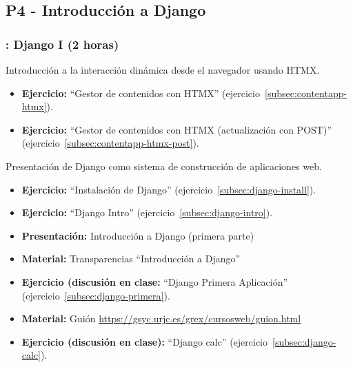 \documentclass[a4paper,12pt]{article}
\begin{document}



\subsection{P4 - Introducción a Django}

\subsubsection{\juevesG: Django I (2 horas)}
\label{cal:juevesG}

Introducción a la interacción dinámica desde el navegador usando HTMX.

\begin{itemize}
\item \textbf{Ejercicio:} ``Gestor de contenidos con HTMX'' (ejercicio~\ref{subsec:contentapp-htmx}).
\item \textbf{Ejercicio:} ``Gestor de contenidos con HTMX (actualización con POST)'' (ejercicio~\ref{subsec:contentapp-htmx-post}).
\end{itemize}

Presentación de Django como sistema de construcción de aplicaciones web.

\begin{itemize}
 \item \textbf{Ejercicio:} ``Instalación de Django'' (ejercicio~\ref{subsec:django-install}).
 \item \textbf{Ejercicio:} ``Django Intro'' (ejercicio~\ref{subsec:django-intro}).
 \item \textbf{Presentación:} Introducción a Django (primera parte)
 \item \textbf{Material:} Transparencias ``Introducción a Django''
 \item \textbf{Ejercicio (discusión en clase:} ``Django Primera Aplicación'' (ejercicio~\ref{subsec:django-primera}).
 \item \textbf{Material:} Guión \url{https://gsyc.urjc.es/grex/cursosweb/guion.html}
 \item \textbf{Ejercicio (discusión en clase):} ``Django calc'' (ejercicio~\ref{subsec:django-calc}).
 \end{itemize}
\end{document}
